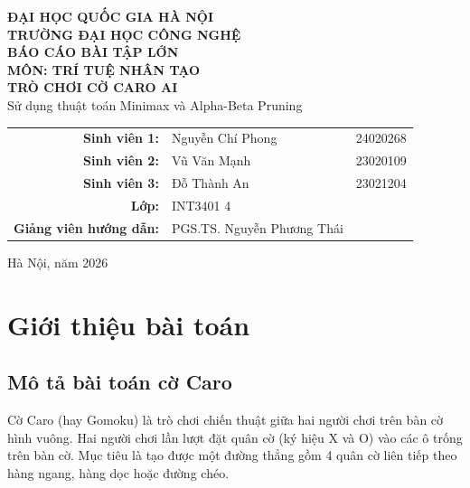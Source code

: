 \documentclass[12pt,a4paper]{article}
\begin{document}
\begin{titlepage}
    \begin{center}
        {\Large \textbf{ĐẠI HỌC QUỐC GIA HÀ NỘI}}\\[0.3cm]
        {\large \textbf{TRƯỜNG ĐẠI HỌC CÔNG NGHỆ}}\\[1.5cm]
        
        {\LARGE \textbf{BÁO CÁO BÀI TẬP LỚN}}\\[0.5cm]
        {\Large \textbf{MÔN: TRÍ TUỆ NHÂN TẠO}}\\[1.5cm]
        
        {\Huge \textbf{TRÒ CHƠI CỜ CARO AI}}\\[1cm]
        {\large Sử dụng thuật toán Minimax và Alpha-Beta Pruning}\\[2cm]
        
        \begin{tabular}{rll}
            \textbf{Sinh viên 1:} & Nguyễn Chí Phong & 24020268 \\[0.2cm]
            \textbf{Sinh viên 2:} & Vũ Văn Mạnh & 23020109 \\[0.2cm]
            \textbf{Sinh viên 3:} & Đỗ Thành An & 23021204 \\[0.2cm]
            \textbf{Lớp:} & INT3401 4 \\[0.2cm]
            \textbf{Giảng viên hướng dẫn:} & PGS.TS. Nguyễn Phương Thái \\
        \end{tabular}
        
        \vfill
        {\large Hà Nội, năm 2026}
    \end{center}
\end{titlepage}

\tableofcontents
\newpage

\section{Giới thiệu bài toán}

\subsection{Mô tả bài toán cờ Caro}

Cờ Caro (hay Gomoku) là trò chơi chiến thuật giữa hai người chơi trên bàn cờ hình vuông. Hai người chơi lần lượt đặt quân cờ (ký hiệu X và O) vào các ô trống trên bàn cờ. Mục tiêu là tạo được một đường thẳng gồm 4 quân cờ liên tiếp theo hàng ngang, hàng dọc hoặc đường chéo.
\end{document}

